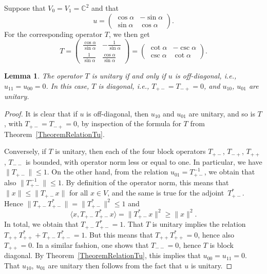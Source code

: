 \documentclass[pdftex]{sigma}
\numberwithin{equation}{section}
\newtheorem{Lemma}[Theorem]{Lemma}
\newcommand{\C}{\mathbb{C}}
\begin{document}
\begin{Example}
Suppose that $V_0 = V_1 = \C^2$ and that
\begin{equation*}
 u = \begin{pmatrix} \cos\alpha & - \sin\alpha \\ \sin\alpha & \cos\alpha \end{pmatrix}.
\end{equation*}
For the corresponding operator $T$, we then get
\begin{equation*}
 T = \begin{pmatrix} \frac{\cos\alpha}{\sin\alpha} & - \frac{1}{\sin\alpha} \\ \frac{1}{\sin\alpha} & \frac{\cos\alpha}{\sin\alpha} \end{pmatrix} = \begin{pmatrix} \cot\alpha & - \csc\alpha \\ \csc\alpha & \cot\alpha \end{pmatrix}.
\end{equation*}
\end{Example}

\begin{Lemma} \label{LemmaTunitary}
The operator $T$ is unitary if and only if $u$ is off-diagonal, i.e., $u_{11} = u_{00} = 0$.
In this case, $T$ is diagonal, i.e., $T_{+-} = T_{-+} = 0$, and $u_{10}$, $u_{01}$ are unitary.
\end{Lemma}

\begin{proof}
It is clear that if $u$ is off-diagonal, then $u_{10}$ and $u_{01}$ are unitary, and so is $T$, with $T_{+-} = T_{-+}=0$, by inspection of the formula for $T$ from Theorem~\ref{TheoremRelationTu}.

Conversely, if $T$ is unitary, then each of the four block operators $T_{+-}$, $T_{-+}$, $T_{++}$, $T_{--}$ is bounded, with operator norm less or equal to one.
In particular, we have $\|T_{+-}\| \leq 1$.
On the other hand, from the relation $u_{01} = T_{+-}^{-1}$, we obtain that also $\big\|T_{+-}^{-1}\big\| \leq 1$.
By definition of the operator norm, this means that $\|x\| \leq \|T_{+-}x\|$ for all $x \in V$, and the same is true for the adjoint~$T_{+-}^*$.
Hence $\|T_{+-}T_{+-}^*\| = \|T_{+-}^*\|^2 \leq 1$ and
\begin{equation*}
\langle x, T_{+-} T_{+-}^* x \rangle = \|T_{+-}^*x\|^2 \geq \|x\|^2.
\end{equation*}
In total, we obtain that $T_{+-} T_{+-}^* = 1$.
That $T$ is unitary implies the relation $T_{++} T_{++}^* + T_{+-} T_{+-}^* = 1$.
But this means that $T_{++} T_{++}^*= 0$, hence also $T_{++}=0$.
In a similar fashion, one shows that $T_{--} = 0$, hence $T$ is block diagonal.
By Theorem~\ref{TheoremRelationTu}, this implies that $u_{00} = u_{11} = 0$.
That $u_{10}$, $u_{01}$ are unitary then follows from the fact that $u$ is unitary.
\end{proof}
\end{document}
